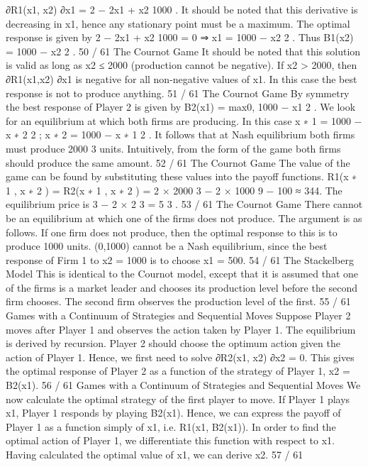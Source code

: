 ∂R1(x1, x2)
∂x1
= 2 −
2x1 + x2
1000
.
It should be noted that this derivative is decreasing in x1, hence
any stationary point must be a maximum.
The optimal response is given by
2 −
2x1 + x2
1000
= 0 ⇒ x1 = 1000 −
x2
2
.
Thus B1(x2) = 1000 −
x2
2
.
50 / 61
The Cournot Game
It should be noted that this solution is valid as long as x2 ≤ 2000
(production cannot be negative).
If x2 > 2000, then ∂R1(x1,x2)
∂x1
is negative for all non-negative values
of x1.
In this case the best response is not to produce anything.
51 / 61
The Cournot Game
By symmetry the best response of Player 2 is given by
B2(x1) = max{0, 1000 −
x1
2
}.
We look for an equilibrium at which both firms are producing. In
this case
x
∗
1 = 1000 −
x
∗
2
2
; x
∗
2 = 1000 −
x
∗
1
2
.
It follows that at Nash equilibrium both firms must produce 2000
3
units.
Intuitively, from the form of the game both firms should produce
the same amount.
52 / 61
The Cournot Game
The value of the game can be found by substituting these values
into the payoff functions.
R1(x
∗
1
, x
∗
2
) = R2(x
∗
1
, x
∗
2
) = 2 ×
2000
3
− 2 ×
1000
9
− 100 ≈ 344.
The equilibrium price is 3 − 2 ×
2
3 =
5
3
.
53 / 61
The Cournot Game
There cannot be an equilibrium at which one of the firms does not
produce. The argument is as follows.
If one firm does not produce, then the optimal response to this is
to produce 1000 units.
(0,1000) cannot be a Nash equilibrium, since the best response of
Firm 1 to x2 = 1000 is to choose x1 = 500.
54 / 61
The Stackelberg Model
This is identical to the Cournot model, except that it is assumed
that one of the firms is a market leader and chooses its production
level before the second firm chooses.
The second firm observes the production level of the first.
55 / 61
Games with a Continuum of Strategies and Sequential
Moves
Suppose Player 2 moves after Player 1 and observes the action
taken by Player 1. The equilibrium is derived by recursion.
Player 2 should choose the optimum action given the action of
Player 1.
Hence, we first need to solve
∂R2(x1, x2)
∂x2
= 0.
This gives the optimal response of Player 2 as a function of the
strategy of Player 1, x2 = B2(x1).
56 / 61
Games with a Continuum of Strategies and Sequential
Moves
We now calculate the optimal strategy of the first player to move.
If Player 1 plays x1, Player 1 responds by playing B2(x1). Hence,
we can express the payoff of Player 1 as a function simply of x1,
i.e. R1(x1, B2(x1)).
In order to find the optimal action of Player 1, we differentiate this
function with respect to x1.
Having calculated the optimal value of x1, we can derive x2.
57 / 61

